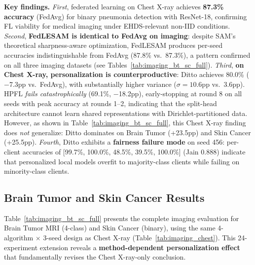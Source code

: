 \documentclass[conference]{IEEEtran}
\begin{document}
\textbf{Key findings.} \textit{First}, federated learning on Chest X-ray achieves \textbf{87.3\% accuracy} (FedAvg) for binary pneumonia detection with ResNet-18, confirming FL viability for medical imaging under EHDS-relevant non-IID conditions. \textit{Second}, \textbf{FedLESAM is identical to FedAvg on imaging}: despite SAM's theoretical sharpness-aware optimization, FedLESAM produces per-seed accuracies indistinguishable from FedAvg (87.8\% vs.\ 87.3\%), a pattern confirmed on all three imaging datasets (see Tables~\ref{tab:imaging_bt_sc_full}). \textit{Third}, \textbf{on Chest X-ray, personalization is counterproductive}: Ditto achieves 80.0\% ($-$7.3pp vs.\ FedAvg), with substantially higher variance ($\sigma{=}10.6$pp vs.\ 3.6pp). HPFL \textit{fails catastrophically} (69.1\%, $-$18.2pp), early-stopping at round 8 on all seeds with peak accuracy at rounds 1--2, indicating that the split-head architecture cannot learn shared representations with Dirichlet-partitioned data. However, as shown in Table~\ref{tab:imaging_bt_sc_full}, this Chest X-ray finding does \textit{not} generalize: Ditto dominates on Brain Tumor (+23.5pp) and Skin Cancer (+25.5pp). \textit{Fourth}, Ditto exhibits a \textbf{fairness failure mode} on seed 456: per-client accuracies of [99.7\%, 100.0\%, 48.5\%, 39.5\%, 100.0\%] (Jain 0.888) indicate that personalized local models overfit to majority-class clients while failing on minority-class clients.


\subsection{Brain Tumor and Skin Cancer Results}
\label{sec:imaging_bt_sc}

Table~\ref{tab:imaging_bt_sc_full} presents the complete imaging evaluation for Brain Tumor MRI (4-class) and Skin Cancer (binary), using the same 4-algorithm $\times$ 3-seed design as Chest X-ray (Table~\ref{tab:imaging_chest}). This 24-experiment extension reveals a \textbf{method-dependent personalization effect} that fundamentally revises the Chest X-ray-only conclusion.
\end{document}
